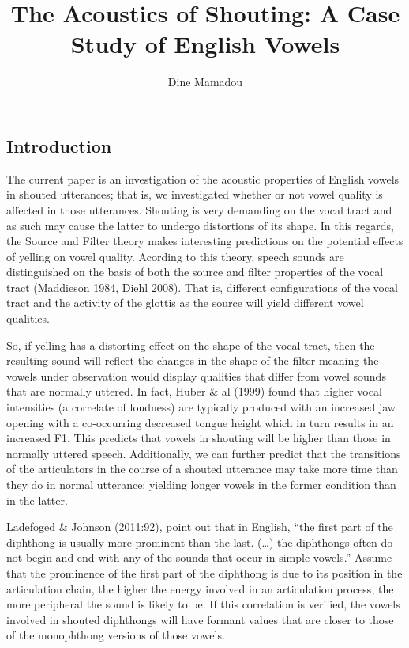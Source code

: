 \documentclass[floatsintext,man]{apa6}
\title{The Acoustics of Shouting: A Case Study of English Vowels}
\author{Dine Mamadou}
\affiliation{
    \vspace{0.5cm}
          \textsuperscript{} Rutgers University  }
\theoremstyle{definition}
\theoremstyle{definition}
\theoremstyle{definition}
\theoremstyle{remark}
\begin{document}
\maketitle

\setcounter{secnumdepth}{0}



\subsection{Introduction}\label{introduction}

The current paper is an investigation of the acoustic properties of
English vowels in shouted utterances; that is, we investigated whether
or not vowel quality is affected in those utterances. Shouting is very
demanding on the vocal tract and as such may cause the latter to undergo
distortions of its shape. In this regards, the Source and Filter theory
makes interesting predictions on the potential effects of yelling on
vowel quality. Acording to this theory, speech sounds are distinguished
on the basis of both the source and filter properties of the vocal tract
(Maddieson 1984, Diehl 2008). That is, different configurations of the
vocal tract and the activity of the glottis as the source will yield
different vowel qualities.

So, if yelling has a distorting effect on the shape of the vocal tract,
then the resulting sound will reflect the changes in the shape of the
filter meaning the vowels under observation would display qualities that
differ from vowel sounds that are normally uttered. In fact, Huber \& al
(1999) found that higher vocal intensities (a correlate of loudness) are
typically produced with an increased jaw opening with a co-occurring
decreased tongue height which in turn results in an increased F1. This
predicts that vowels in shouting will be higher than those in normally
uttered speech. Additionally, we can further predict that the
transitions of the articulators in the course of a shouted utterance may
take more time than they do in normal utterance; yielding longer vowels
in the former condition than in the latter.

Ladefoged \& Johnson (2011:92), point out that in English, \enquote{the
first part of the diphthong is usually more prominent than the last.
(\ldots{}) the diphthongs often do not begin and end with any of the
sounds that occur in simple vowels.} Assume that the prominence of the
first part of the diphthong is due to its position in the articulation
chain, the higher the energy involved in an articulation process, the
more peripheral the sound is likely to be. If this correlation is
verified, the vowels involved in shouted diphthongs will have formant
values that are closer to those of the monophthong versions of those
vowels.
\end{document}
